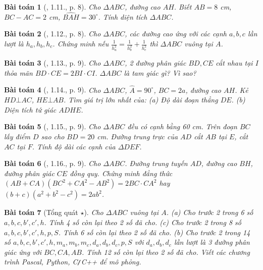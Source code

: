 \documentclass{article}
\newtheorem{baitoan}{Bài toán}
\begin{document}
\begin{baitoan}[\cite{TLCT_THCS_Toan_9_hinh_hoc}, 1.11., p. 8]
	Cho $\Delta ABC$, đường cao $AH$. Biết $AB = 8$ {\rm cm}, $BC - AC = 2$ {\rm cm}, $\widehat{BAH} = 30^\circ$. Tính diện tích $\Delta ABC$.
\end{baitoan}

\begin{baitoan}[\cite{TLCT_THCS_Toan_9_hinh_hoc}, 1.12., p. 8]
	Cho $\Delta ABC$, các đường cao ứng với các cạnh $a,b,c$ lần lượt là $h_a,h_b,h_c$. Chứng minh nếu $\frac{1}{h_a^2} = \frac{1}{h_b^2} + \frac{1}{h_c^2}$ thì $\Delta ABC$ vuông tại $A$.
\end{baitoan}

\begin{baitoan}[\cite{TLCT_THCS_Toan_9_hinh_hoc}, 1.13., p. 9]
	Cho $\Delta ABC$, 2 đường phân giác $BD,CE$ cắt nhau tại $I$ thỏa mãn $BD\cdot CE= 2BI\cdot CI$. $\Delta ABC$ là tam giác gì? Vì sao?
\end{baitoan}

\begin{baitoan}[\cite{TLCT_THCS_Toan_9_hinh_hoc}, 1.14., p. 9]
	Cho $\Delta ABC$, $\widehat{A} = 90^\circ$, $BC = 2a$, đường cao $AH$. Kẻ $HD\bot AC$, $HE\bot AB$. Tìm giá trị lớn nhất của: (a) Độ dài đoạn thẳng $DE$. (b) Diện tích tứ giác $ADHE$.
\end{baitoan}

\begin{baitoan}[\cite{TLCT_THCS_Toan_9_hinh_hoc}, 1.15., p. 9]
	Cho $\Delta ABC$ đều có cạnh bằng {\rm60 cm}. Trên đoạn $BC$ lấy điểm $D$ sao cho $BD = 20$ {\rm cm}. Đường trung trực của $AD$ cắt $AB$ tại $E$, cắt $AC$ tại $F$. Tính độ dài các cạnh của $\Delta DEF$.
\end{baitoan}

\begin{baitoan}[\cite{TLCT_THCS_Toan_9_hinh_hoc}, 1.16., p. 9]
	Cho $\Delta ABC$. Đường trung tuyến $AD$, đường cao $BH$, đường phân giác $CE$ đồng quy. Chứng minh đẳng thức $(AB + CA)(BC^2 + CA^2 - AB^2) = 2BC\cdot CA^2$ hay $(b + c)(a^2 + b^2 - c^2) = 2ab^2$.
\end{baitoan}

\begin{baitoan}[Tổng quát $\star$]
	Cho $\Delta ABC$ vuông tại $A$. (a) Cho trước 2 trong 6 số $a,b,c,b',c',h$. Tính 4 số còn lại theo 2 số đã cho. (c) Cho trước 2 trong 8 số $a,b,c,b',c',h,p,S$. Tính 6 số còn lại theo 2 số đã cho. (b) Cho trước 2 trong 14 số $a,b,c,b',c',h,m_a,m_b,m_c,d_a,d_b,d_c,p,S$ với $d_a,d_b,d_c$ lần lượt là 3 đường phân giác ứng với $BC,CA,AB$. Tính 12 số còn lại theo 2 số đã cho. Viết các chương trình {\sf Pascal, Python, C\texttt{/}C++} để mô phỏng.
\end{baitoan}
\end{document}
